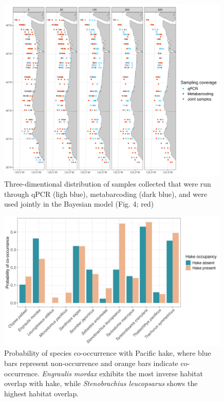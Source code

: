 \documentclass[9pt,twoside,lineno]{pnas-SI}
\begin{document}
\begin{figure}
\centering
\includegraphics[width=0.99\textwidth]{plots/7_Supplementary_Figure_3.jpg}
\caption{Three-dimentional distribution of samples collected that were run through qPCR (ligh blue), metabarcoding (dark blue), and were used jointly in the Bayesian model (Fig. 4; red)}
\end{figure}

\begin{figure}
\centering
\includegraphics[width=0.99\textwidth]{plots/8_Supplementary_Figure_4.jpg}
\caption{Probability of species co-occurrence with Pacific hake, where blue bars represent non-occurrence and orange bars indicate co-occurrence. \textit{Engraulis mordax} exhibits the most inverse habitat overlap with hake, while \textit{Stenobrachius leucopsarus} shows the highest habitat overlap.}
\end{figure}
\end{document}
